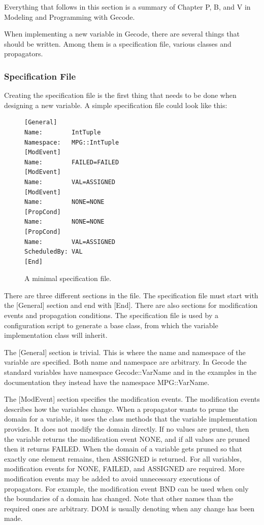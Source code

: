 \documentclass[a4paper,11pt]{article}
\begin{document}
Everything that follows in this section is a summary of Chapter P, B, and V in Modeling and Programming with Gecode\cite{mpg}. 

When implementing a new variable in Gecode, there are several things that should be written. Among them is a specification file, various classes and propagators.
\subsubsection{Specification File}\label{sec:specfile}
Creating the specification file is the first thing that needs to be done when designing a new variable.  A simple specification file could look like this:

\begin{figure}[H]
\begin{minipage}{\linewidth}
\begin{lstlisting}[frame=single]
[General]
Name:        IntTuple
Namespace:   MPG::IntTuple
[ModEvent]
Name:        FAILED=FAILED
[ModEvent]
Name:        VAL=ASSIGNED
[ModEvent]
Name:        NONE=NONE
[PropCond]
Name:        NONE=NONE
[PropCond]
Name:        VAL=ASSIGNED
ScheduledBy: VAL
[End]
\end{lstlisting}
\end{minipage}
\caption{A minimal specification file.}
\end{figure}

There are three different sections in the file. The specification file must start with the [General] section and end with [End]. There are also sections for modification events and propagation conditions. The specification file is used by a configuration script to generate a base class, from which the variable implementation class will inherit.

The [General] section is trivial. This is where the name and namespace of the variable are specified. Both name and namespace are arbitrary. In Gecode the standard variables have namespace Gecode::VarName and in the examples in the documentation they instead have the namespace MPG::VarName.

The [ModEvent] section specifies the modification events. The modification events describes how the variables change. When a propagator wants to prune the domain for a variable, it uses the class methods that the variable implementation provides. It does not modify the domain directly. If no values are pruned, then the variable returns the modification event NONE, and if all values are pruned then it returns FAILED. When the domain of a variable gets pruned so that exactly one element remains, then ASSIGNED is returned. For all variables, modification events for NONE, FAILED, and ASSIGNED are required. More modification events may be added to avoid unnecessary executions of propagators. For example, the modification event BND can be used when only the boundaries of a domain has changed. Note that other names than the required ones are arbitrary. DOM is usually denoting when any change has been made.
\end{document}

